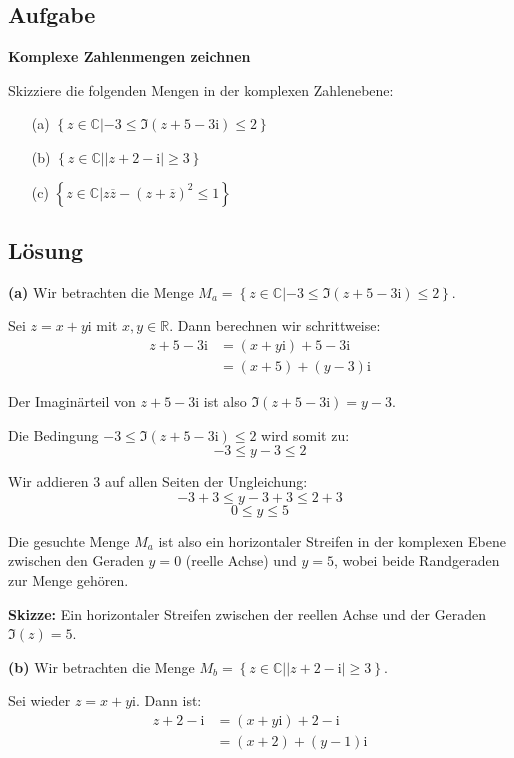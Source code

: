 \documentclass{article}
\newcommand{\im}{\mathrm{i}}
\newcommand{\C}{\mathbb{C}}
\newcommand{\abs}[1]{\left|#1\right|}
\newcommand{\conj}[1]{\overline{#1}}
\newcommand{\Set}[1]{\left\{#1\right\}}
\begin{document}
\subsection*{Aufgabe}
\textbf{Komplexe Zahlenmengen zeichnen}

Skizziere die folgenden Mengen in der komplexen Zahlenebene:
\begin{enumerate}
  \item[(a)] $\Set{ z \in \C | -3 \leq \Im(z+5-3\im) \leq 2 }$
  \item[(b)] $\Set{ z \in \C | \abs{z + 2 - \im} \geq 3 }$
  \item[(c)] $\Set{ z \in \C | z \conj{z} - (z + \conj{z} )^2 \leq 1 }$
\end{enumerate}

\subsection*{Lösung}

\textbf{(a)} Wir betrachten die Menge $M_a = \Set{ z \in \C | -3 \leq \Im(z+5-3\im) \leq 2 }$.

Sei $z = x + y\im$ mit $x, y \in \mathbb{R}$. Dann berechnen wir schrittweise:
\begin{align}
z + 5 - 3\im &= (x + y\im) + 5 - 3\im \\
&= (x + 5) + (y - 3)\im
\end{align}

Der Imaginärteil von $z + 5 - 3\im$ ist also $\Im(z + 5 - 3\im) = y - 3$. 

Die Bedingung $-3 \leq \Im(z+5-3\im) \leq 2$ wird somit zu:
$$-3 \leq y - 3 \leq 2$$

Wir addieren 3 auf allen Seiten der Ungleichung:
$$-3 + 3 \leq y - 3 + 3 \leq 2 + 3$$
$$0 \leq y \leq 5$$

Die gesuchte Menge $M_a$ ist also ein horizontaler Streifen in der komplexen Ebene zwischen den Geraden $y = 0$ (reelle Achse) und $y = 5$, wobei beide Randgeraden zur Menge gehören.

\textbf{Skizze:} Ein horizontaler Streifen zwischen der reellen Achse und der Geraden $\Im(z) = 5$.

\textbf{(b)} Wir betrachten die Menge $M_b = \Set{ z \in \C | \abs{z + 2 - \im} \geq 3 }$.

Sei wieder $z = x + y\im$. Dann ist:
\begin{align}
z + 2 - \im &= (x + y\im) + 2 - \im \\
&= (x + 2) + (y - 1)\im
\end{align}
\end{document}
